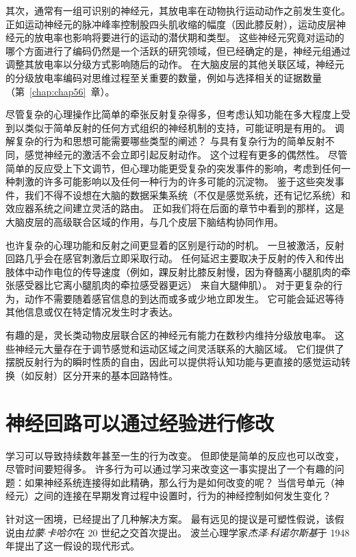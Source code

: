 其次，通常有一组可识别的神经元，其放电率在动物执行运动动作之前发生变化。 
正如运动神经元的脉冲峰率控制股四头肌收缩的幅度（因此膝反射），运动皮层神经元的放电率也影响将要进行的运动的潜伏期和类型。 
这些神经元究竟对运动的哪个方面进行了编码仍然是一个活跃的研究领域，但已经确定的是，神经元组通过调整其放电率以分级方式影响随后的动作。 
在大脑皮层的其他关联区域，神经元的分级放电率编码对思维过程至关重要的数量，例如与选择相关的证据数量（第~\ref{chap:chap56}~章）。


尽管复杂的心理操作比简单的牵张反射复杂得多，但考虑认知功能在多大程度上受到以类似于简单反射的任何方式组织的神经机制的支持，可能证明是有用的。 
调解复杂的行为和思想可能需要哪些类型的阐述？ 
与具有复杂行为的简单反射不同，感觉神经元的激活不会立即引起反射动作。 
这个过程有更多的偶然性。 
尽管简单的反应受上下文调节，但心理功能更受复杂的突发事件的影响，考虑到任何一种刺激的许多可能影响以及任何一种行为的许多可能的沉淀物。 
鉴于这些突发事件，我们不得不设想在大脑的数据采集系统（不仅是感觉系统，还有记忆系统）和效应器系统之间建立灵活的路由。 
正如我们将在后面的章节中看到的那样，这是大脑皮层的高级联合区域的作用，与几个皮层下脑结构协同作用。


也许复杂的心理功能和反射之间更显着的区别是行动的时机。 
一旦被激活，反射回路几乎会在感官刺激后立即采取行动。 
任何延迟主要取决于反射的传入和传出肢体中动作电位的传导速度（例如，踝反射比膝反射慢，因为脊髓离小腿肌肉的牵张感受器比它离小腿肌肉的牵拉感受器更远） 来自大腿伸肌）。 
对于更复杂的行为，动作不需要随着感官信息的到达而或多或少地立即发生。 它可能会延迟等待其他信息或仅在特定情况发生时才表达。


有趣的是，灵长类动物皮层联合区的神经元有能力在数秒内维持分级放电率。 
这些神经元大量存在于调节感觉和运动区域之间灵活联系的大脑区域。 
它们提供了摆脱反射行为的瞬时性质的自由，因此可以提供将认知功能与更直接的感觉运动转换（如反射）区分开来的基本回路特性。


\section{神经回路可以通过经验进行修改}
学习可以导致持续数年甚至一生的行为改变。 
但即使是简单的反应也可以改变，尽管时间要短得多。 
许多行为可以通过学习来改变这一事实提出了一个有趣的问题：如果神经系统连接得如此精确，那么行为是如何改变的呢？ 
当信号单元（神经元）之间的连接在早期发育过程中设置时，行为的神经控制如何发生变化？


针对这一困境，已经提出了几种解决方案。 
最有远见的提议是可塑性假说，该假说由\textit{拉蒙$\cdot$卡哈尔}在 20 世纪之交首次提出。 
波兰心理学家\textit{杰泽$\cdot$科诺尔斯基}于 1948 年提出了这一假设的现代形式。


